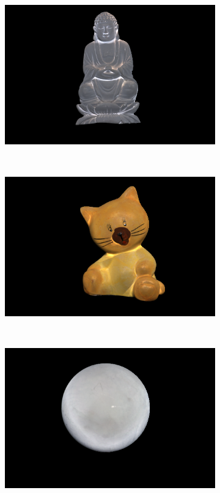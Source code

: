 \documentclass{paper}
\begin{document}
\begin{figure}[h!]
        \centering
        \begin{subfigure}{0.3\textwidth}
                \includegraphics[width=\textwidth]{report_fig/buddha_ca}
        \end{subfigure}
        ~ 
        \begin{subfigure}{0.3\textwidth}
                \includegraphics[width=\textwidth]{report_fig/cat_ca}
        \end{subfigure}
        ~ 
        \begin{subfigure}{0.3\textwidth}
                \includegraphics[width=\textwidth]{report_fig/gray_ca}

\end{subfigure}
\end{figure}
\end{document}
